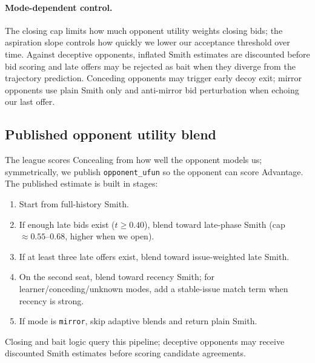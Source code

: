 \documentclass[11pt]{article}
\begin{document}
\begin{table}[ht]
  \centering
  \caption{Classified opponent mode and agent response.}
  \label{tab:modes}
  \footnotesize
\end{table}

\paragraph{Mode-dependent control.}
The closing cap limits how much opponent utility weights closing bids; the aspiration slope
controls how quickly we lower our acceptance threshold over time.
Against deceptive opponents, inflated Smith estimates are discounted before bid scoring and
late offers may be rejected as bait when they diverge from the trajectory prediction.
Conceding opponents may trigger early decoy exit; mirror opponents use plain Smith only and
anti-mirror bid perturbation when echoing our last offer.

\subsection{Published opponent utility blend}

The league scores Concealing from how well the opponent models us; symmetrically, we publish
\texttt{opponent\_ufun} so the opponent can score Advantage.
The published estimate is built in stages:
\begin{enumerate}
  \item Start from full-history Smith.
  \item If enough late bids exist ($t \ge 0.40$), blend toward late-phase Smith (cap
        ${\approx}0.55$--$0.68$, higher when we open).
  \item If at least three late offers exist, blend toward issue-weighted late Smith.
  \item On the second seat, blend toward recency Smith; for learner/conceding/unknown modes,
        add a stable-issue match term when recency is strong.
  \item If mode is \texttt{mirror}, skip adaptive blends and return plain Smith.
\end{enumerate}
Closing and bait logic query this pipeline; deceptive opponents may receive discounted Smith
estimates before scoring candidate agreements.
\end{document}
